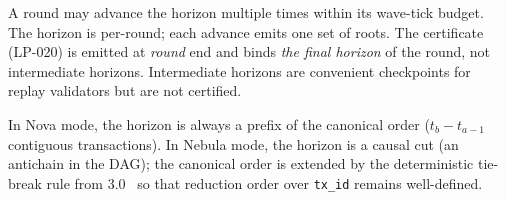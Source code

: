 A round may advance the horizon multiple times within its wave-tick
budget. The horizon is per-round; each advance emits one set of roots.
The certificate (LP-020) is emitted at \emph{round} end and binds
\emph{the final horizon} of the round, not intermediate horizons.
Intermediate horizons are convenient checkpoints for replay validators
but are not certified.

\begin{remark}
In Nova mode, the horizon is always a prefix of the canonical order
($t_b - t_{a-1}$ contiguous transactions). In Nebula mode, the horizon
is a causal cut (an antichain in the DAG); the canonical order is
extended by the deterministic tie-break rule from
3.0~\cite{lp010-quasarstm-3} so that reduction order over
\texttt{tx\_id} remains well-defined.
\end{remark}

